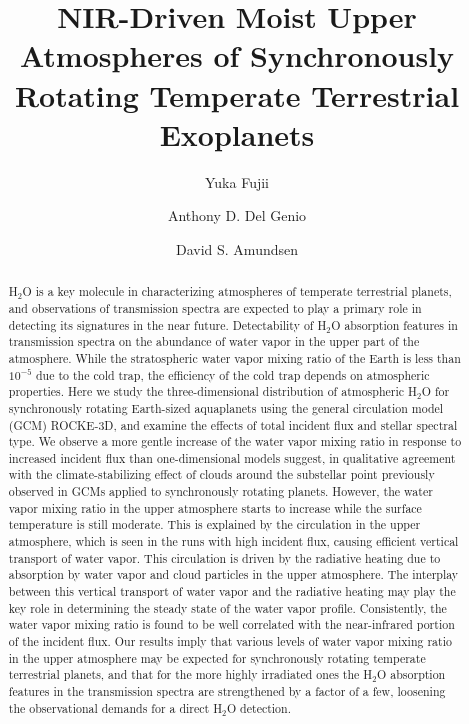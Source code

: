 \documentclass[11pt,numberedappendix,twocolappendix,]{emulateapj}
\def\revise#1{{\color{red}{#1}}}
\begin{document}

\title{NIR-Driven Moist Upper Atmospheres of Synchronously Rotating Temperate Terrestrial Exoplanets}

\author{Yuka Fujii}

\author{Anthony D. Del Genio}

\author{David S. Amundsen}


\begin{abstract}
%
H$_2$O is a key molecule in characterizing atmospheres of temperate terrestrial planets, and observations of transmission spectra are expected to play a primary role in detecting its signatures in the near future. 
Detectability of H$_2$O absorption features in transmission spectra \revise{is contingent} on the abundance of water vapor in the upper part of the atmosphere. 
While the stratospheric water vapor mixing ratio of the Earth is less than $10^{-5}$ due to the cold trap, the efficiency of the cold trap depends on atmospheric properties. 
Here we study the three-dimensional distribution of atmospheric H$_2$O for synchronously rotating Earth-sized aquaplanets using the general circulation model (GCM) ROCKE-3D, and examine the effects of total incident flux and stellar spectral type.  
We observe a more gentle increase of the water vapor mixing ratio in response to increased incident flux than one-dimensional models suggest, in qualitative agreement with the climate-stabilizing effect of clouds around the substellar point previously observed in GCMs applied to synchronously rotating planets. 
However, the water vapor mixing ratio in the upper atmosphere starts to increase while the surface temperature is still moderate. 
This is explained by the circulation in the upper atmosphere, which is seen in the runs with high incident flux, causing efficient vertical transport of water vapor. 
This circulation is driven by the radiative heating due to absorption by water vapor and cloud particles in the upper atmosphere. 
The interplay between this vertical transport of water vapor and the radiative heating may play the key role in determining the steady state of the water vapor profile. 
Consistently, the water vapor mixing ratio is found to be well correlated with the near-infrared portion of the incident flux. 
Our results imply that various levels of water vapor mixing ratio in the upper atmosphere may be expected for synchronously rotating temperate terrestrial planets, and that for the more highly irradiated ones the H$_2$O absorption features in the transmission spectra are strengthened by a factor of a few, loosening the observational demands for a direct H$_2$O detection. 
%
\end{abstract}
\end{document}
